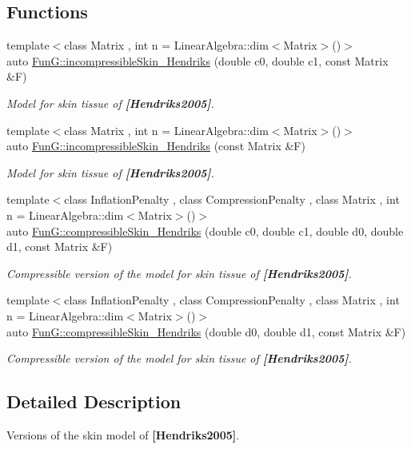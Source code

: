 \subsection*{Functions}
\begin{DoxyCompactItemize}
\item 
{\footnotesize template$<$class Matrix , int n = Linear\+Algebra\+::dim$<$\+Matrix$>$()$>$ }\\auto \hyperlink{group__Biomechanics_gaa20bf15ef6976d64d89490429035b2c4}{Fun\+G\+::incompressible\+Skin\+\_\+\+Hendriks} (double c0, double c1, const Matrix \&F)
\begin{DoxyCompactList}\small\item\em Model for skin tissue of {\bfseries [Hendriks2005]}. \end{DoxyCompactList}\item 
{\footnotesize template$<$class Matrix , int n = Linear\+Algebra\+::dim$<$\+Matrix$>$()$>$ }\\auto \hyperlink{group__Biomechanics_gad8653218bd2afb4e3cfd601a5142956c}{Fun\+G\+::incompressible\+Skin\+\_\+\+Hendriks} (const Matrix \&F)
\begin{DoxyCompactList}\small\item\em Model for skin tissue of {\bfseries [Hendriks2005]}. \end{DoxyCompactList}\item 
{\footnotesize template$<$class Inflation\+Penalty , class Compression\+Penalty , class Matrix , int n = Linear\+Algebra\+::dim$<$\+Matrix$>$()$>$ }\\auto \hyperlink{group__Biomechanics_ga07b4c52c6ecf7e72f73ab5832fb262cd}{Fun\+G\+::compressible\+Skin\+\_\+\+Hendriks} (double c0, double c1, double d0, double d1, const Matrix \&F)
\begin{DoxyCompactList}\small\item\em Compressible version of the model for skin tissue of {\bfseries [Hendriks2005]}. \end{DoxyCompactList}\item 
{\footnotesize template$<$class Inflation\+Penalty , class Compression\+Penalty , class Matrix , int n = Linear\+Algebra\+::dim$<$\+Matrix$>$()$>$ }\\auto \hyperlink{group__Biomechanics_ga42721e772b7eada1b0bca98247ad440f}{Fun\+G\+::compressible\+Skin\+\_\+\+Hendriks} (double d0, double d1, const Matrix \&F)
\begin{DoxyCompactList}\small\item\em Compressible version of the model for skin tissue of {\bfseries [Hendriks2005]}. \end{DoxyCompactList}\end{DoxyCompactItemize}


\subsection{Detailed Description}
Versions of the skin model of {\bfseries [Hendriks2005]}. 

